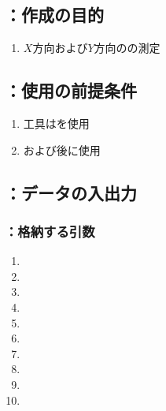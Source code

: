 \clearpage


\subsection{\MCenterline：作成の目的}
\begin{enumerate}[label*=\sarrow]
\item $X$方向および$Y$方向の\CenterlineEndFaceDif の測定
\end{enumerate}


\subsection{\MCenterline：使用の前提条件}
\begin{enumerate}[label*=\sarrow]
\item 工具は\TouchSensorProbe を使用
\item \TopOutcutMilling および\BottomOutcutMilling 後に使用
\end{enumerate}


\subsection{\MCenterline：データの入出力}

\subsubsection{\MCenterline：格納する引数}
\begin{enumerate}[label*=\sarrow]
\item \PMCenterlineEndFaceDifAC
\item \PMAlocationAngle
\item \PMTopOutcutACWidth
\item \PMTopOutcutBDWidth
\item \PMBottomOutcutACWidth
\item \PMBottomOutcutBDWidth
\item \PMTopReAlocationLength
\item \PMBottomReAlocationLength
\item \PMKeywayPos
\item \PMBottomOutcutLength
\end{enumerate}

